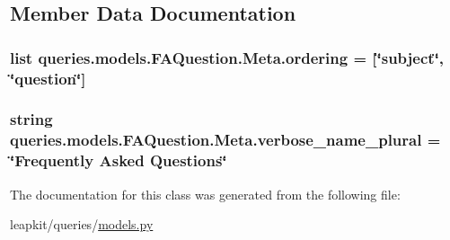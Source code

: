 \subsection{Member Data Documentation}
\hypertarget{classqueries_1_1models_1_1_f_a_question_1_1_meta_aaae6f66fc19f80e21b763850f5b0a81d}{
\subsubsection[{ordering}]{\setlength{\rightskip}{0pt plus 5cm}list queries.\-models.\-F\-A\-Question.\-Meta.\-ordering = \mbox{[}\char`\"{}subject\char`\"{}, \char`\"{}{\bf question}\char`\"{}\mbox{]}\hspace{0.3cm}{\ttfamily [static]}}}\label{classqueries_1_1models_1_1_f_a_question_1_1_meta_aaae6f66fc19f80e21b763850f5b0a81d}
\hypertarget{classqueries_1_1models_1_1_f_a_question_1_1_meta_a5801c8deb1baf27bb00dcd39388b1406}{
\subsubsection[{verbose\-\_\-name\-\_\-plural}]{\setlength{\rightskip}{0pt plus 5cm}string queries.\-models.\-F\-A\-Question.\-Meta.\-verbose\-\_\-name\-\_\-plural = \char`\"{}Frequently Asked Questions\char`\"{}\hspace{0.3cm}{\ttfamily [static]}}}\label{classqueries_1_1models_1_1_f_a_question_1_1_meta_a5801c8deb1baf27bb00dcd39388b1406}


The documentation for this class was generated from the following file\-:\begin{DoxyCompactItemize}
\item 
leapkit/queries/\hyperlink{queries_2models_8py}{models.\-py}\end{DoxyCompactItemize}
